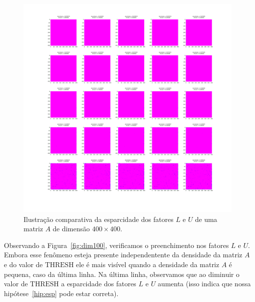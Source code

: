 \documentclass[12pt,a4paper]{article}
\begin{document}
\begin{figure}[!htb]
    \begin{center}
        \includegraphics[width=\textwidth, trim=300 300 250 100, clip]{src/dim400.png}
    \end{center}
    \caption{Ilustração comparativa da esparcidade dos fatores $L$ e $U$ de uma
    matriz $A$ de dimensão $400 \times 400$.}
    \label{fig:dim400}
\end{figure}

Observando a Figura~\ref{fig:dim100}, verificamos o preenchimento nos fatores
$L$ e $U$. Embora esse fenômeno esteja presente independentente da densidade da
matriz $A$ e do valor de $\mathrm{THRESH}$ ele é mais visível quando a densidade
da matriz $A$ é pequena, caso da última linha. Na última linha, observamos que
ao diminuir o valor de $\mathrm{THRESH}$ a esparcidade dos fatores $L$ e $U$
aumenta (isso indica que nossa hipótese~\ref{hip:esp} pode estar correta).
\end{document}

